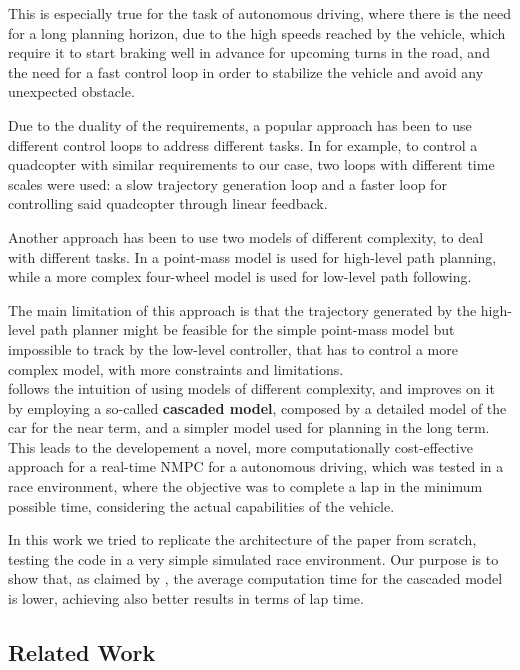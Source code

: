 \documentclass[a4paper, onecolumn, 12pt]{article}
\begin{document}
This is especially true for the task of autonomous driving, where there is the need for a long planning horizon, due to the high speeds reached by the vehicle, which require it to start braking well in advance for upcoming turns in the road, and the need for a fast control loop in order to stabilize the vehicle and avoid any unexpected obstacle.

Due to the duality of the requirements, a popular approach has been to use different control loops to address different tasks. In \cite{Gros2007} for example, to control a quadcopter with similar requirements to our case, two loops with different time scales were used: a slow trajectory generation loop and a faster loop for controlling said quadcopter through linear feedback. 

Another approach has been to use two models of different complexity, to deal with different tasks. In \cite{Gao2010} a point-mass model is used for high-level path planning, while a more complex four-wheel model is used for low-level path following.

The main limitation of this approach is that the trajectory generated by the high-level path planner might be feasible for the simple point-mass model but impossible to track by the low-level controller, that has to control a more complex model, with more constraints and limitations.\\

\cite{paper} follows the intuition of using models of different complexity, and improves on it by employing a so-called \textbf{cascaded model}, composed by a
detailed model of the car for the near term, and a simpler model used for
planning in the long term. 
This leads to the developement a novel, more computationally
cost-effective approach for a real-time NMPC for a autonomous driving, which
was tested in a race environment, where the objective was to complete a lap in
the minimum possible time, considering the actual capabilities of the vehicle. 

In this work we tried to replicate the architecture of the paper from scratch,
testing the code in a very simple simulated race environment. Our purpose is to
show that, as claimed by \cite{paper}, the average computation time for the
cascaded model is lower, achieving also better results in terms of lap time.


\subsection*{Related Work}
\end{document}
